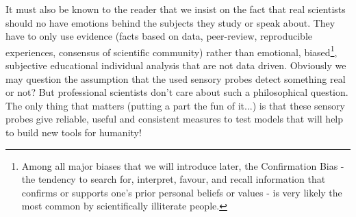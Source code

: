 	It must also be known to the reader that we insist on the fact that real scientists should no have emotions behind the subjects they study or speak about. They have to only use evidence (facts based on data, peer-review, reproducible experiences, consensus of scientific community) rather than emotional, biased\footnote{Among all major biases that we will introduce later, the Confirmation Bias - the tendency to search for, interpret, favour, and recall information that confirms or supports one's prior personal beliefs or values - is very likely the most common by scientifically illiterate people.}, subjective educational individual analysis that are not data driven. Obviously we may question the assumption that the used sensory probes detect something real or not? But professional scientists don't care about such a philosophical question. The only thing that matters (putting a part the fun of it...) is that these sensory probes give reliable, useful and consistent measures to test models that will help to build new tools for humanity!

